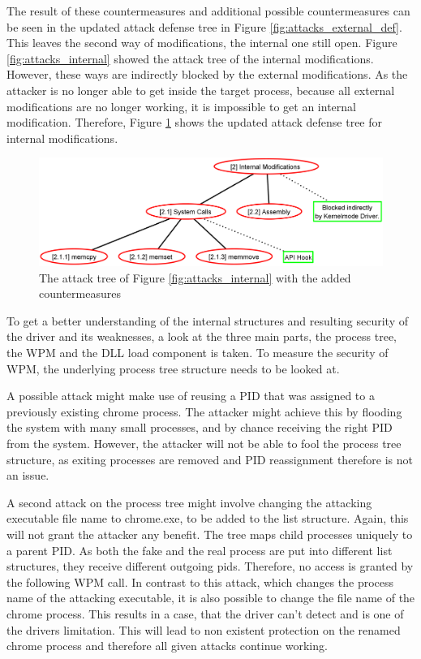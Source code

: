 The result of these countermeasures and additional possible countermeasures can be seen in the updated attack defense tree in Figure \ref{fig:attacks_external_def}. This leaves the second way of modifications, the internal one still open. Figure \ref{fig:attacks_internal} showed the attack tree of the internal modifications. However, these ways are indirectly blocked by the external modifications. As the attacker is no longer able to get inside the target process, because all external modifications are no longer working, it is impossible to get an internal modification. Therefore, Figure \ref{fig:attacks_internal_def} shows the updated attack defense tree for internal modifications.
\begin{figure}[!htbp]
\centering
\includegraphics[scale=0.25]{sections/adtrees/InternalModifications.png}
\caption{The attack tree of Figure \ref{fig:attacks_internal} with the added countermeasures}
\label{fig:attacks_internal_def}
\end{figure}

To get a better understanding of the internal structures and resulting security of the driver and its weaknesses, a look at the three main parts, the process tree, the \gls{WPM} and the \gls{DLL} load component is taken.
To measure the security of \gls{WPM}, the underlying process tree structure needs to be looked at. 

A possible attack might make use of reusing a \gls{PID} that was assigned to a previously existing chrome process. The attacker might achieve this by flooding the system with many small processes, and by chance receiving the right \gls{PID} from the system. However, the attacker will not be able to fool the process tree structure, as exiting processes are removed and \gls{PID} reassignment therefore is not an issue. 

A second attack on the process tree might involve changing the attacking executable file name to chrome.exe, to be added to the list structure. Again, this will not grant the attacker any benefit. The tree maps child processes uniquely to a parent \gls{PID}. As both the fake and the real process are put into different list structures, they receive different outgoing pids. Therefore, no access is granted by the following \gls{WPM} call. In contrast to this attack, which changes the process name of the attacking executable, it is also possible to change the file name of the chrome process. This results in a case, that the driver can't detect and is one of the drivers limitation. This will lead to non existent protection on the renamed chrome process and therefore all given attacks continue working.

